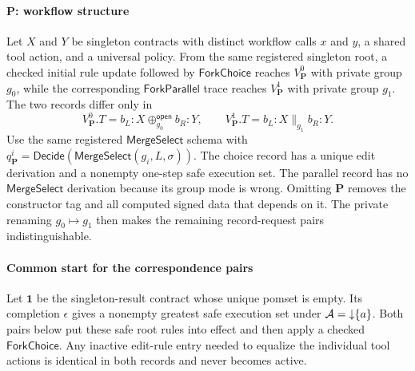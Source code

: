 \paragraph{\(\mathbf P\): workflow structure}
Let \(X\) and \(Y\) be singleton contracts with distinct workflow calls \(x\) and \(y\), a shared tool action, and a universal policy.
From the same registered singleton root, a checked initial rule update followed by \(\mathsf{ForkChoice}\) reaches \(V_{\mathbf P}^0\) with private group \(g_0\), while the corresponding \(\mathsf{ForkParallel}\) trace reaches \(V_{\mathbf P}^1\) with private group \(g_1\).
The two records differ only in
\[
 V_{\mathbf P}^0.T=b_L{:}X\oplus_{g_0}^{\mathsf{open}}b_R{:}Y,
 \qquad
 V_{\mathbf P}^1.T=b_L{:}X\parallel_{g_1} b_R{:}Y .
\]
Use the same registered \(\mathsf{MergeSelect}\) schema with \(q_{\mathbf P}^i=\mathsf{Decide}(\mathsf{MergeSelect}(g_i,L,\sigma))\).
The choice record has a unique edit derivation and a nonempty one-step safe execution set.
The parallel record has no \(\mathsf{MergeSelect}\) derivation because its group mode is wrong.
Omitting \(\mathbf P\) removes the constructor tag and all computed signed data that depends on it.
The private renaming \(g_0\mapsto g_1\) then makes the remaining record-request pairs indistinguishable.

\paragraph{Common start for the correspondence pairs}
Let \(\mathbf 1\) be the singleton-result contract whose unique pomset is empty.
Its completion \(\epsilon\) gives a nonempty greatest safe execution set under \(\mathcal A=\mathord{\downarrow}\{a\}\).
Both pairs below put these safe root rules into effect and then apply a checked \(\mathsf{ForkChoice}\).
Any inactive edit-rule entry needed to equalize the individual tool actions is identical in both records and never becomes active.

